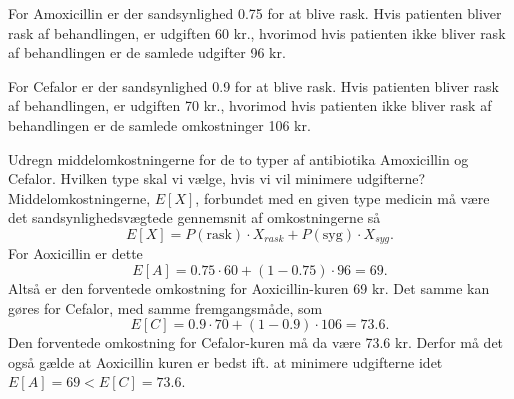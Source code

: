 \documentclass[12pt]{article}
\theoremstyle{definition}
\begin{document}
\vspace{14pt}

For Amoxicillin er der sandsynlighed \num{0,75} for at blive rask. Hvis patienten bliver rask af behandlingen, er udgiften 60 kr., hvorimod hvis patienten ikke bliver rask af behandlingen er de samlede udgifter 96 kr.

\vspace{14pt}

For Cefalor er der sandsynlighed \num{0,9} for at blive rask. Hvis patienten bliver rask af behandlingen, er udgiften 70 kr., hvorimod hvis patienten ikke bliver rask af behandlingen er de samlede omkostninger 106 kr.

\vspace{14pt}

Udregn middelomkostningerne for de to typer af antibiotika Amoxicillin og Cefalor.  Hvilken type skal vi vælge, hvis vi vil minimere udgifterne?
\bigbreak
Middelomkostningerne, $E[X]$, forbundet med en given type medicin må være det sandsynlighedsvægtede gennemsnit af omkostningerne så
\[ 
  E[X] = P(\mathrm{rask}) \cdot X_{rask} + P(\mathrm{syg}) \cdot X_{syg}
.\]
For Aoxicillin er dette
\[ 
  E[A] = \num{0,75} \cdot 60 + (1-\num{0,75}) \cdot 96 = 69 
.\]
Altså er den forventede omkostning for Aoxicillin-kuren 69 kr. Det samme kan gøres for Cefalor, med samme fremgangsmåde, som
\[ 
  E[C] = \num{0,9} \cdot 70 + (1-\num{0,9}) \cdot 106 = \num{73,6} 
.\]
Den forventede omkostning for Cefalor-kuren må da være \num{73,6} kr. Derfor må det også gælde at Aoxicillin kuren er bedst ift. at minimere udgifterne idet $E[A] = 69 < E[C] = \num{73,6}$.
\end{document}
